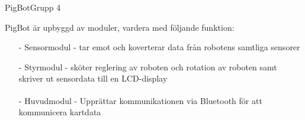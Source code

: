 \begin{frame}[fragile]{PigBot}{Grupp 4}

PigBot är upbyggd av moduler, vardera med följande funktion:
  \begin{itemize}
\pause
    \item[-] Sensormodul - tar emot och koverterar data från robotens samtliga sensorer
\pause
    \item[-] Styrmodul - sköter reglering av roboten och rotation av roboten samt skriver ut sensordata till en LCD-display
\pause
    \item[-] Huvudmodul - Upprättar kommunikationen via Bluetooth\textsuperscript{\circledR} för att kommunicera kartdata
  \end{itemize}
\end{frame}







